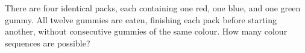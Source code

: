 There are four identical packs, each containing one red, one blue, and one green gummy. All twelve gummies are eaten, finishing each pack before starting another, without consecutive gummies of the same colour. How many colour sequences are possible?
